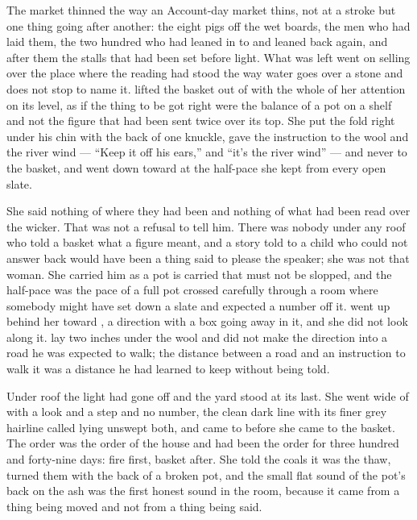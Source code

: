 The market thinned the way an Account-day market thins, not at a stroke but one thing going after another: the eight pigs off the wet boards, the men who had laid them, the two hundred who had leaned in to  and leaned back again, and after them the stalls that had been set before light. What was left went on selling over the place where the reading had stood the way water goes over a stone and does not stop to name it.  lifted the basket out of  with the whole of her attention on its level, as if the thing to be got right were the balance of a pot on a shelf and not the figure that had been sent twice over its top. She put the fold right under his chin with the back of one knuckle, gave the instruction to the wool and the river wind --- “Keep it off his ears,” and “it's the river wind” --- and never to the basket, and went down toward  at the half-pace she kept from every open slate.

She said nothing of where they had been and nothing of what had been read over the wicker. That was not a refusal to tell him. There was nobody under any roof who told a basket what a figure meant, and a story told to a child who could not answer back would have been a thing said to please the speaker; she was not that woman. She carried him as a pot is carried that must not be slopped, and the half-pace was the pace of a full pot crossed carefully through a room where somebody might have set down a slate and expected a number off it.  went up behind her toward , a direction with a box going away in it, and she did not look along it.  lay two inches under the wool and did not make the direction into a road he was expected to walk; the distance between a road and an instruction to walk it was a distance he had learned to keep without being told.

Under  roof the light had gone off  and the yard stood at its last. She went wide of  with a look and a step and no number, the clean dark line with its finer grey hairline called  lying unswept both, and came to  before she came to the basket. The order was the order of the house and had been the order for three hundred and forty-nine days: fire first, basket after. She told the coals it was the thaw, turned them with the back of a broken pot, and the small flat sound of the pot's back on the ash was the first honest sound in the room, because it came from a thing being moved and not from a thing being said.

